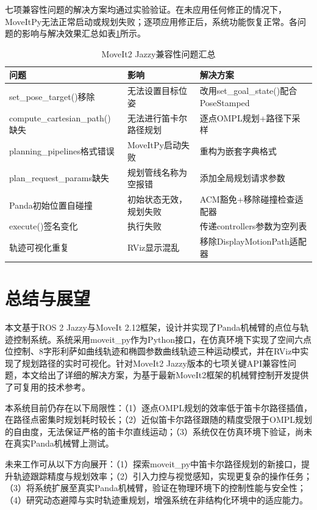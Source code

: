 \documentclass[a4paper,12pt]{ctexart}
\newcommand{\bodytext}{\fontsize{12pt}{20pt}\selectfont\setlength{\parskip}{0pt}}
\begin{document}
七项兼容性问题的解决方案均通过实验验证。在未应用任何修正的情况下，MoveItPy无法正常启动或规划失败；逐项应用修正后，系统功能恢复正常。各问题的影响与解决效果汇总如表\ref{tab:compat}所示。

\begin{table}[htbp]
\centering
\caption{MoveIt2 Jazzy兼容性问题汇总}
\label{tab:compat}
\fontsize{10.5pt}{16pt}\selectfont
\begin{tabular}{p{3.8cm}p{3.8cm}p{4.5cm}}
\toprule
问题 & 影响 & 解决方案 \\
\midrule
set\_pose\_target()移除 & 无法设置目标位姿 & 改用set\_goal\_state()配合PoseStamped \\
compute\_cartesian\_path()缺失 & 无法进行笛卡尔路径规划 & 逐点OMPL规划+路径下采样 \\
planning\_pipelines格式错误 & MoveItPy启动失败 & 重构为嵌套字典格式 \\
plan\_request\_params缺失 & 规划管线名称为空报错 & 添加全局规划请求参数 \\
Panda初始位置自碰撞 & 初始状态无效，规划失败 & ACM豁免+移除碰撞检查适配器 \\
execute()签名变化 & 执行失败 & 传递controllers参数为空列表 \\
轨迹可视化重复 & RViz显示混乱 & 移除DisplayMotionPath适配器 \\
\bottomrule
\end{tabular}
\end{table}

\section{总结与展望}

\bodytext

本文基于ROS 2 Jazzy与MoveIt 2.12框架，设计并实现了Panda机械臂的点位与轨迹控制系统。系统采用moveit\_py作为Python接口，在仿真环境下实现了空间六点位控制、8字形利萨如曲线轨迹和椭圆参数曲线轨迹三种运动模式，并在RViz中实现了规划路径的实时可视化。针对MoveIt2 Jazzy版本的七项关键API兼容性问题，本文给出了详细的解决方案，为基于最新MoveIt2框架的机械臂控制开发提供了可复用的技术参考。

本系统目前仍存在以下局限性：（1）逐点OMPL规划的效率低于笛卡尔路径插值，在路径点密集时规划耗时较长；（2）近似笛卡尔路径跟随的精度受限于OMPL规划的自由度，无法保证严格的笛卡尔直线运动；（3）系统仅在仿真环境下验证，尚未在真实Panda机械臂上测试。

未来工作可从以下方向展开：（1）探索moveit\_py中笛卡尔路径规划的新接口，提升轨迹跟踪精度与规划效率；（2）引入力控与视觉感知，实现更复杂的操作任务；（3）将系统扩展至真实Panda机械臂，验证在物理环境下的控制性能与安全性；（4）研究动态避障与实时轨迹重规划，增强系统在非结构化环境中的适应能力。
\end{document}
